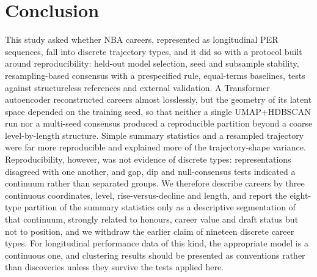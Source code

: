 \section{Conclusion}\label{sec:conclusion}

This study asked whether NBA careers, represented as longitudinal PER sequences, fall into discrete trajectory types, and it did so with a protocol built around reproducibility: held-out model selection, seed and subsample stability, resampling-based consensus with a prespecified rule, equal-terms baselines, tests against structureless references and external validation. A Transformer autoencoder reconstructed careers almost losslessly, but the geometry of its latent space depended on the training seed, so that neither a single UMAP+HDBSCAN run nor a multi-seed consensus produced a reproducible partition beyond a coarse level-by-length structure. Simple summary statistics and a resampled trajectory were far more reproducible and explained more of the trajectory-shape variance. Reproducibility, however, was not evidence of discrete types: representations disagreed with one another, and gap, dip and null-consensus tests indicated a continuum rather than separated groups. We therefore describe careers by three continuous coordinates, level, rise-versus-decline and length, and report the eight-type partition of the summary statistics only as a descriptive segmentation of that continuum, strongly related to honours, career value and draft status but not to position, and we withdraw the earlier claim of nineteen discrete career types. For longitudinal performance data of this kind, the appropriate model is a continuous one, and clustering results should be presented as conventions rather than discoveries unless they survive the tests applied here.
